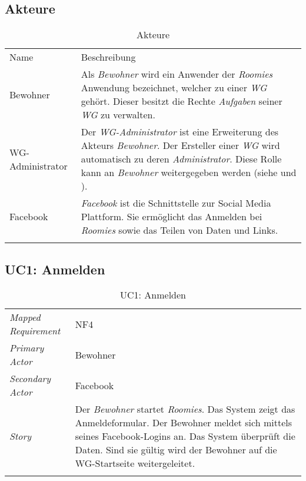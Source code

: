 \subsection{Akteure}
\begin{table}[H]
	\tablestyle
	\tablealtcolored
	\begin{tabularx}{\textwidth}{lX}
		\tableheadcolor
		\tablehead Name &
		\tablehead Beschreibung \tabularnewline
		\tablebody
			Bewohner &
			Als \emph{Bewohner} wird ein Anwender der \emph{Roomies} Anwendung bezeichnet, welcher zu einer \emph{WG} gehört. \newline
			Dieser besitzt die Rechte \emph{Aufgaben} seiner \emph{WG} zu verwalten.
			\tabularnewline
			WG-Administrator &
			Der \emph{WG-Administrator} ist eine Erweiterung des Akteurs \emph{Bewohner}. Der Ersteller einer \emph{WG} wird automatisch zu deren \emph{Administrator}. Diese Rolle kann an \emph{Bewohner} weitergegeben werden (siehe \nameref{subsec:uc4} und \nameref{subsec:uc10}).
			\tabularnewline
			Facebook &
			\emph{Facebook} ist die Schnittstelle zur Social Media Plattform. Sie ermöglicht das Anmelden bei \emph{Roomies} sowie das Teilen von Daten und Links.
			\tabularnewline
		\tableend
	\end{tabularx}
	\caption{Akteure}
\end{table}

\subsection{UC1: Anmelden}\label{subsec:uc1}
\begin{table}[H]
	\tablestyle
	\tablealtcolored
	\begin{tabularx}{\textwidth}{lX}
		\tablebody
			\textit{Mapped Requirement} &
			NF4
			\tabularnewline
			\textit{Primary Actor} &
			Bewohner
			\tabularnewline
			\textit{Secondary Actor} &
			Facebook
			\tabularnewline
			\textit{Story} &
			Der \emph{Bewohner} startet \emph{Roomies}. Das System zeigt das Anmeldeformular. Der Bewohner meldet sich mittels seines Facebook-Logins an. Das System überprüft die Daten. Sind sie gültig wird der Bewohner auf die WG-Startseite weitergeleitet.
			\tabularnewline
		\tableend
	\end{tabularx}
	\caption{UC1: Anmelden}
\end{table}


